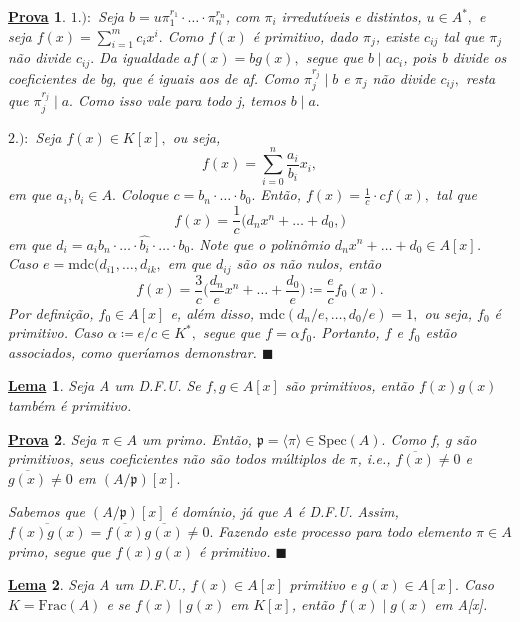 \documentclass{article}
\newtheorem*{lemma*}{\underline{Lema}}
\newtheorem*{proof*}{\underline{Prova}}
\renewcommand\qedsymbol{$\blacksquare$}
\begin{document}
\begin{proof*}
  \(1.):\) Seja \(b = u\pi_{1}^{r_{1}}\cdot \dotsc \cdot \pi_{n}^{r_{n}}\), com \(\pi_{i}\) irredutíveis e distintos, \(u\in A^{*},\)
e seja \(f(x) = \sum\limits_{i=1}^{m}c_{i}x^{i}.\) Como \(f(x)\) é primitivo, dado \(\pi_{j}\), existe \(c_{ij}\) tal que \(\pi_{j}\) 
não divide \(c_{ij}.\) Da igualdade \(af(x) = bg(x),\) segue que \(b\mid ac_{i}\), pois b divide os coeficientes
de bg, que é iguais aos de af. Como \(\pi_{j}^{r_{j}}\mid b\) e \(\pi_{j}\) não divide \(c_{ij},\) resta que \(\pi_{j}^{r_{j}}\mid a.\) 
Como isso vale para todo j, temos \(b\mid a.\)

  \(2.):\) Seja \(f(x)\in K[x],\) ou seja, 
  \[
    f(x) = \sum\limits_{i=0}^{n}\frac{a_{i}}{b_{i}}x_{i},
  \]
  em que \(a_{i}, b_{i}\in A.\) Coloque \(c = b_{n}\cdot \dotsc \cdot b_{0}.\) Então,
 \(f(x) = \frac{1}{c} \cdot cf(x),\) tal que 
  \[
    f(x) = \frac{1}{c}\biggl(d_{n}x^{n}+ \dotsc +d_{0},\biggr)
  \]
  em que \(d_{i} = a_{i}b_{n} \cdot \dotsc \cdot \hat{b_{i}}\cdot \dotsc \cdot b_{0}.\) Note que o polinômio 
 \(d_{n}x^{n} + \dotsc  + d_{0}\in A[x]\).
  Caso \(e = \mathrm{mdc}(d_{i1}, \dotsc , d_{ik},\) em que \(d_{ij}\) são os não nulos, então 
  \[
    f(x) = \frac{3}{c}\biggl(\frac{d_{n}}{e}x^{n} + \dotsc + \frac{d_{0}}{e}\biggr)\coloneqq \frac{e}{c}f_{0}(x).
  \]
  Por definição, \(f_{0}\in A[x]\) e, além disso, \(\mathrm{mdc}(d_{n}/e, \dotsc , d_{0}/e) = 1,\) ou seja, \(f_{0}\) é primitivo.
Caso \(\alpha\coloneqq e/c \in K^{*},\) segue que \(f = \alpha f_{0}.\) Portanto, \(f\) e \(f_{0}\) estão associados, como queríamos demonstrar. \qedsymbol
\end{proof*}
\begin{lemma*}
  Seja A um D.F.U. Se \(f, g\in A[x]\) são primitivos, então \(f(x)g(x)\) também é primitivo.
\end{lemma*}
\begin{proof*}
  Seja \(\pi \in A\) um primo. Então, \(\mathfrak{p} = \langle \pi  \rangle\in \mathrm{Spec}(A).\) Como f, g
são primitivos, seus coeficientes não são todos múltiplos de \(\pi \), i.e., \(\overline{f(x)}\neq 0\) e 
 \(\overline{g(x)}\neq 0\) em \((A/\mathfrak{p})[x].\)

  Sabemos que \((A/\mathfrak{p})[x]\) é domínio, já que A é D.F.U. Assim, \(\overline{f(x)g(x)} = \overline{f(x)}\overline{g(x)}\neq0.\) Fazendo este processo para 
todo elemento \(\pi \in A\) primo, segue que \(f(x)g(x)\) é primitivo. \qedsymbol
\end{proof*}
\begin{lemma*}
  Seja A um D.F.U., \(f(x)\in A[x]\) primitivo e \(g(x)\in A[x].\) Caso \(K = \mathrm{Frac}(A)\) e se \(f(x)\mid g(x)\) em \(K[x]\), então
 \(f(x)\mid g(x)\) em A[x].
\end{lemma*}
\end{document}
